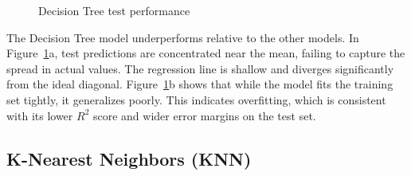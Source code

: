 \begin{figure}[!ht]
    \centering
    \hfill
    \caption{Decision Tree test performance}
    \caption*{\hspace{1em}}
    \label{fig:dt_results}
\end{figure}
\FloatBarrier

The Decision Tree model underperforms relative to the other models. In Figure~\ref{fig:dt_results}a, test predictions are concentrated near the mean, failing to capture the spread in actual values. The regression line is shallow and diverges significantly from the ideal diagonal. Figure~\ref{fig:dt_results}b shows that while the model fits the training set tightly, it generalizes poorly. This indicates overfitting, which is consistent with its lower $R^2$ score and wider error margins on the test set.

\subsection{K-Nearest Neighbors (KNN)}

